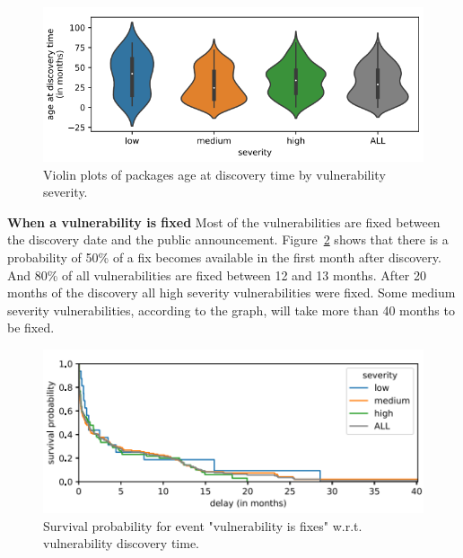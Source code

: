 \documentclass[pdf,bookmarks,colorlinks=true]{IEEEtran}
\begin{document}
\begin{figure}[h]
	\centering
	\includegraphics[scale=0.45]{WhenDiscovered.png}
	\caption{Violin plots of packages age at discovery time by vulnerability severity.}
	\label{WhenDiscovered}
\end{figure}


\textbf{When a vulnerability is fixed}
Most of the vulnerabilities are fixed between the discovery date and the public announcement. Figure~\ref{WhenIsFixed} shows that there is a probability of 50\% of a fix becomes available in the first month after discovery. And 80\% of all vulnerabilities are fixed between 12 and 13 months. After 20 months of the discovery all high severity vulnerabilities were fixed. Some medium severity vulnerabilities, according to the graph, will take more than 40 months to be fixed.

\begin{figure}[h]
	\centering
	\includegraphics[scale=0.75]{WhenIsFixed.png}
	\caption{Survival probability for event "vulnerability is fixes" w.r.t. vulnerability discovery time.}
	\label{WhenIsFixed}
\end{figure}

\end{document}

